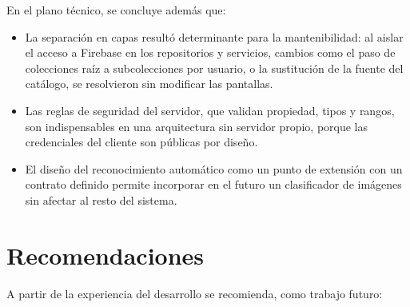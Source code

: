 En el plano técnico, se concluye además que:

\begin{itemize}
    \item La separación en capas resultó determinante para la mantenibilidad:
    al aislar el acceso a Firebase en los repositorios y servicios, cambios
    como el paso de colecciones raíz a subcolecciones por usuario, o la
    sustitución de la fuente del catálogo, se resolvieron sin modificar las
    pantallas.
    \item Las reglas de seguridad del servidor, que validan propiedad, tipos y
    rangos, son indispensables en una arquitectura sin servidor propio, porque
    las credenciales del cliente son públicas por diseño.
    \item El diseño del reconocimiento automático como un punto de extensión
    con un contrato definido permite incorporar en el futuro un clasificador
    de imágenes sin afectar al resto del sistema.
\end{itemize}

\section{Recomendaciones}
\label{sec:recomendaciones}

A partir de la experiencia del desarrollo se recomienda, como trabajo futuro:

